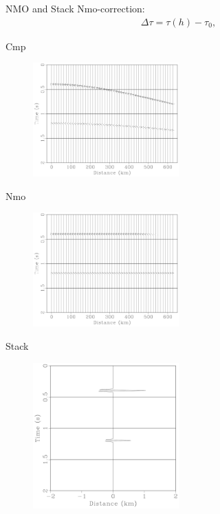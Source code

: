 \documentclass[xcolor=dvipsnames,notes]{beamer}
\begin{document}
\begin{frame}{NMO and Stack}
Nmo-correction:
%
\begin{eqnarray}
 \Delta \tau = \tau(h)-\tau_0,
\label{eq:dtnmo}
\end{eqnarray}
\end{frame}
%
\begin{frame}{Cmp}
\begin{figure}
 \includegraphics[width=0.50\textwidth]{Fig/synshot.pdf}
\end{figure}
\end{frame}
\begin{frame}{Nmo}
\begin{figure}
 \includegraphics[width=0.50\textwidth]{Fig/syncmp.pdf}
\end{figure}
\end{frame}
\begin{frame}{Stack}
\begin{figure}
 \includegraphics[width=0.50\textwidth]{Fig/synstack.pdf}
\end{figure}
\end{frame}
\end{document}
